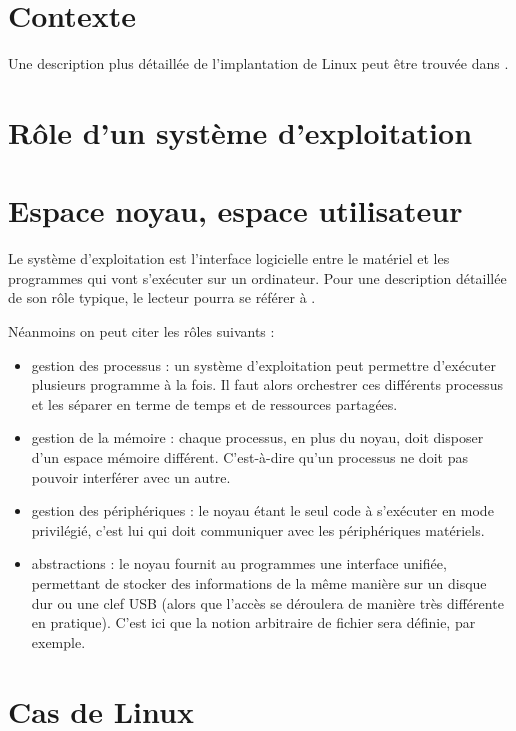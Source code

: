\section{Contexte}

Une description plus détaillée de l'implantation de Linux peut être trouvée dans
\cite{UnderstandingTheLinuxKernel}.

\section{Rôle d'un système d'exploitation}
\section{Espace noyau, espace utilisateur}


Le système d'exploitation est l'interface logicielle entre le matériel et les
programmes qui vont s'exécuter sur un ordinateur. Pour une description détaillée
de son rôle typique, le lecteur pourra se référer à \cite{tanenbaum}.

Néanmoins on peut citer les rôles suivants :

\begin{itemize}
\item gestion des processus : un système d'exploitation peut permettre
  d'exécuter plusieurs programme à la fois. Il faut alors orchestrer ces
  différents processus et les séparer en terme de temps et de ressources
  partagées.
\item
  gestion de la mémoire : chaque processus, en plus du noyau, doit disposer d'un
  espace mémoire différent. C'est-à-dire qu'un processus ne doit pas pouvoir
  interférer avec un autre.
\item
  gestion des périphériques : le noyau étant le seul code à s'exécuter en mode
  privilégié, c'est lui qui doit communiquer avec les périphériques matériels.
\item
  abstractions : le noyau fournit au programmes une interface unifiée,
  permettant de stocker des informations de la même manière sur un disque dur ou
  une clef USB (alors que l'accès se déroulera de manière très différente en
  pratique). C'est ici que la notion arbitraire de fichier sera définie, par exemple.
\end{itemize}

\section{Cas de Linux}

